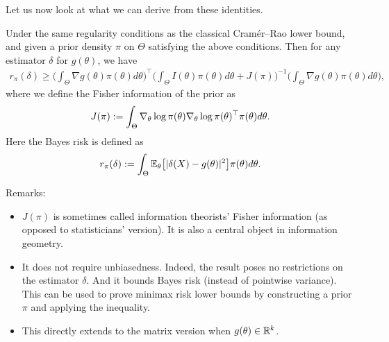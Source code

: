 \documentclass[11pt,letterpaper]{article}
\numberwithin{theorem}{lecture}
\numberwithin{proposition}{lecture}
\numberwithin{lemma}{lecture}
\numberwithin{claim}{lecture}
\numberwithin{corollary}{lecture}
\numberwithin{definition}{lecture}
\numberwithin{conjecture}{lecture}
\numberwithin{remark}{lecture}
\numberwithin{example}{lecture}
\numberwithin{equation}{lecture}
\begin{document}
Let us now look at what we can derive from these identities.
\begin{theorem}
  Under the same regularity conditions as the classical Cram\'{e}r--Rao lower bound, and given a prior density $\pi$ on $\Theta$ satisfying the above conditions. Then for any estimator $\delta$ for $g (\theta)$, we have
  \begin{align*}
    r_\pi (\delta) \geq \Big( \int_\Theta \nabla g (\theta) \pi (\theta) d \theta \Big)^\top \Big( \int_\Theta I(\theta) \pi (\theta) d\theta + J (\pi) \Big)^{-1} \Big( \int_\Theta \nabla g (\theta) \pi (\theta) d\theta \Big),
  \end{align*}
  where we define the Fisher information of the prior as
  \begin{align*}
    J (\pi) := \int_\Theta \nabla_\theta \log \pi (\theta) \nabla_\theta \log \pi (\theta)^\top \pi (\theta) d\theta.
  \end{align*}
  Here the Bayes risk is defined as
  \begin{align*}
    r_\pi (\delta) := \int_\Theta {\mathbb{E}}_\theta \big[ |\delta (X) - g (\theta)|^2 \big] \pi (\theta) d\theta.
  \end{align*}
\end{theorem}
Remarks:
\begin{itemize}
  \item $J(\pi)$ is sometimes called information theorists' Fisher information (as opposed to statisticians' version). It is also a central object in information geometry.
  \item It does not require unbiasedness. Indeed, the result poses no restrictions on the estimator $\delta$. And it bounds Bayes risk (instead of pointwise variance). This can be used to prove minimax risk lower bounds by constructing a prior $\pi$ and applying the inequality.
  \item This directly extends to the matrix version when $g (\theta) \in \mathbb{R}^k$.
\end{itemize}
\end{document}

